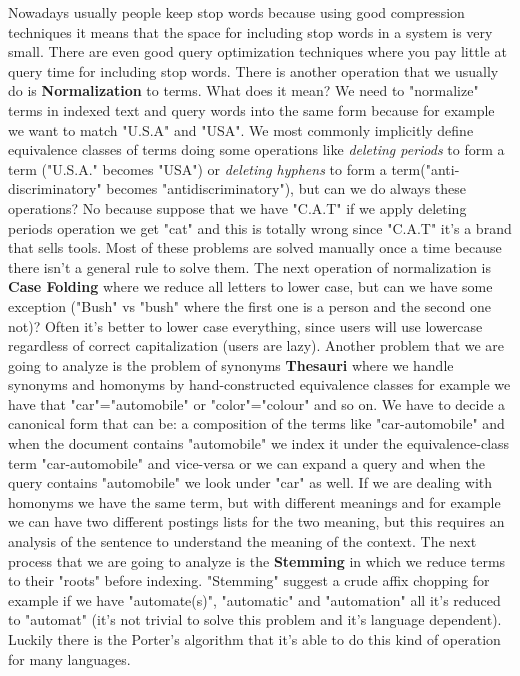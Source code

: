 Nowadays usually people keep stop words because using good compression techniques it means that the space for including stop words in a system is very small. There are even good query optimization techniques where you pay little at query time for including stop words.\newline
There is another operation that we usually do is \textbf{Normalization} to terms. What does it mean? We need to "normalize" terms in indexed text and query words into the same form because for example we want to match "U.S.A" and "USA". We most commonly implicitly define equivalence classes of terms doing some operations like \textit{deleting periods} to form a term ("U.S.A." becomes "USA") or \textit{deleting hyphens} to form a term("anti-discriminatory" becomes "antidiscriminatory"), but can we do always these operations? No because suppose that we have "C.A.T" if we apply deleting periods operation we get "cat" and this is totally wrong since "C.A.T" it's a brand that sells tools. Most of these problems are solved manually once a time because there isn't a general rule to solve them.\newline
The next operation of normalization is \textbf{Case Folding} where we reduce all letters to lower case, but can we have some exception ("Bush" vs "bush" where the first one is a person and the second one not)? Often it's better to lower case everything, since users will use lowercase regardless of correct capitalization (users are lazy).
Another problem that we are going to analyze is the problem of synonyms \textbf{Thesauri} where we handle synonyms and homonyms by hand-constructed equivalence classes for example we have that "car"="automobile" or "color"="colour" and so on. We have to decide a canonical form that can be: a composition of the terms like "car-automobile" and when the document contains "automobile" we index it under the equivalence-class term "car-automobile" and vice-versa or we can expand a query and when the query contains "automobile" we look under "car" as well. If we are dealing with homonyms we have the same term, but with different meanings and for example we can have two different postings lists for the two meaning, but this requires an analysis of the sentence to understand the meaning of the context.\newline
The next process that we are going to analyze is the \textbf{Stemming} in which we reduce terms to their "roots" before indexing. "Stemming" suggest a crude affix chopping for example if we have "automate(s)", "automatic" and "automation" all it's reduced to "automat" (it's not trivial to solve this problem and it's language dependent). Luckily there is the Porter's algorithm that it's able to do this kind of operation for many languages.\newline
